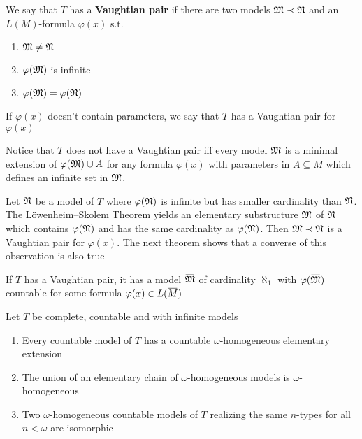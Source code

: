 \documentclass[11pt]{article}
\begin{document}
\begin{definition}[]
We say that \(T\) has a \textbf{Vaughtian pair} if there are two models \(\mathfrak{M}\prec\mathfrak{N}\) and
an \(L(M)\)-formula \(\varphi(x)\) s.t.
\begin{enumerate}
\item \(\mathfrak{M}\neq\mathfrak{N}\)
\item \(\varphi(\mathfrak{M})\) is infinite
\item \(\varphi(\mathfrak{M})=\varphi(\mathfrak{N})\)
\end{enumerate}


If \(\varphi(x)\) doesn't contain parameters, we say that \(T\) has a Vaughtian pair for \(\varphi(x)\)
\end{definition}

\begin{remark}
Notice that \(T\) does not have a Vaughtian pair iff every model \(\mathfrak{M}\) is a minimal extension
of \(\varphi(\mathfrak{M})\cup A\) for any formula \(\varphi(x)\) with parameters in \(A\subseteq M\) which defines an infinite
set in \(\mathfrak{M}\).
\end{remark}



Let \(\mathfrak{N}\) be a model of \(T\) where \(\varphi(\mathfrak{N})\) is infinite but has smaller cardinality than \(\mathfrak{N}\).
The Löwenheim–Skolem Theorem yields an elementary substructure \(\mathfrak{M}\) of \(\mathfrak{N}\) which
contains \(\varphi(\mathfrak{N})\) and has the same cardinality as \(\varphi(\mathfrak{N})\). Then \(\mathfrak{M}\prec\mathfrak{N}\) is a Vaughtian pair
for \(\varphi(x)\). The next theorem shows that a converse of this observation is also true

\begin{theorem}
\label{thm5.5.2}
If \(T\) has a Vaughtian pair, it has a model \(\barfM\) of cardinality \(\aleph_1\)
with \(\varphi(\barfM)\) countable for some formula \(\varphi(x)\in L(\barM)\)
\end{theorem}

\begin{lemma}[]
\label{lemma5.5.3}
Let \(T\) be complete, countable and with infinite models
\begin{enumerate}
\item Every countable model of \(T\) has a countable \(\omega\)-homogeneous elementary extension
\item The union of an elementary chain of \(\omega\)-homogeneous models is \(\omega\)-homogeneous
\item Two \(\omega\)-homogeneous countable models of \(T\) realizing the same \(n\)-types for all \(n<\omega\)
are isomorphic
\end{enumerate}
\end{lemma}
\end{document}
